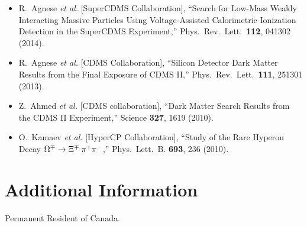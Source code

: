 \documentclass[overlapped, line, 10pt]{res}
\begin{document}
\begin{resume}
\begin{itemize}
    \item R.~Agnese {\it et al.}  [SuperCDMS Collaboration],
    ``Search for Low-Mass Weakly Interacting Massive Particles Using Voltage-Assisted Calorimetric Ionization Detection in the SuperCDMS Experiment,'' Phys.\ Rev.\ Lett.\  {\bf 112}, 041302 (2014).
    \item R.~Agnese {\it et al.}  [CDMS Collaboration],
  ``Silicon Detector Dark Matter Results from the Final Exposure of CDMS II,''
  Phys.\ Rev.\ Lett.\ {\bf 111}, 251301 (2013).
    \item Z.~Ahmed {\it et al.}  [CDMS collaboration],
    ``Dark Matter Search Results from the CDMS II Experiment,''
    Science {\bf 327}, 1619 (2010).
    \item O.~Kamaev \textit{et al.} [HyperCP Collaboration],
     ``Study of the Rare Hyperon Decay ${\boldmath
       \Omega^\mp \to \Xi^\mp \: \pi^+\pi^-}$,'' Phys.\ Lett.\ B. \textbf{693}, 236 (2010).

\end{itemize}

\section{\sc Additional Information}
Permanent Resident of Canada.

\end{resume}
\end{document}
